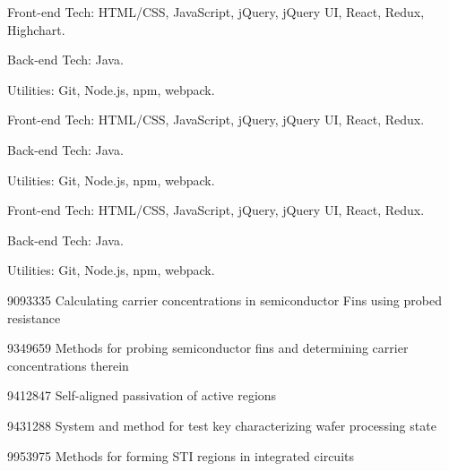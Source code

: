 \documentclass[10pt, a4paper]{puredoc-cv}
\begin{document}
\begin{skipwrapper}
  \begin{cvitems}
    \item {Front-end Tech: HTML/CSS, JavaScript, jQuery, jQuery UI, React, Redux, Highchart.}
    \item {Back-end Tech: Java.}
    \item {Utilities: Git, Node.js, npm, webpack.}
  \end{cvitems}
\end{skipwrapper}
\begin{skipwrapper}
  \begin{cvitems}
    \item {Front-end Tech: HTML/CSS, JavaScript, jQuery, jQuery UI, React, Redux.}
    \item {Back-end Tech: Java.}
    \item {Utilities: Git, Node.js, npm, webpack.}
  \end{cvitems}
\end{skipwrapper}
\begin{skipwrapper}
  \begin{cvitems}
    \item {Front-end Tech: HTML/CSS, JavaScript, jQuery, jQuery UI, React, Redux.}
    \item {Back-end Tech: Java.}
    \item {Utilities: Git, Node.js, npm, webpack.}
  \end{cvitems}
\end{skipwrapper}
\begin{skipwrapper}
\end{skipwrapper}
\begin{skipwrapper}
\end{skipwrapper}
\begin{skipwrapper}
  \begin{cvitems}
    \item {9093335 Calculating carrier concentrations in semiconductor Fins using probed resistance}
    \item {9349659 Methods for probing semiconductor fins and determining carrier concentrations therein}
    \item {9412847 Self-aligned passivation of active regions}
    \item {9431288 System and method for test key characterizing wafer processing state}
    \item {9953975 Methods for forming STI regions in integrated circuits}
  \end{cvitems}
\end{skipwrapper}
\end{document}
